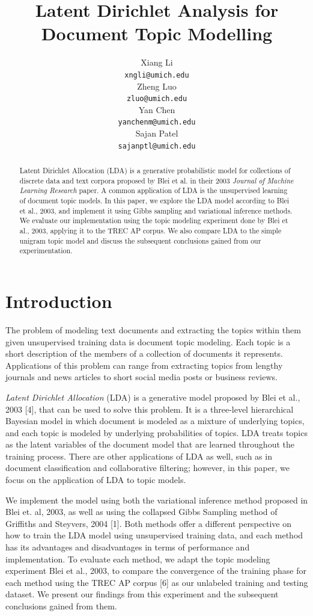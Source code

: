 \documentclass{article} %
\title{Latent Dirichlet Analysis for Document Topic Modelling}
\author{
Xiang Li\\
\texttt{xngli@umich.edu} \\
\And
Zheng Luo \\
\texttt{zluo@umich.edu} \\
\AND
Yan Chen\\
\texttt{yanchenm@umich.edu} \\
\And
Sajan Patel\\
\texttt{sajanptl@umich.edu} \\
}
\begin{document}
\maketitle

\begin{abstract}
Latent Dirichlet Allocation (LDA) is a generative probabilistic model for collections of discrete data and text 
corpora proposed by Blei et al. in their 2003 \textit{Journal\- of Machine Learning Research} paper. 
A common application of LDA is the unsupervised learning of document topic models. 
In this paper, we explore the LDA model according 
to Blei et al., 2003, and implement it using Gibbs sampling and variational inference methods. We evaluate our 
implementation using the topic modeling experiment done by Blei et al., 2003, applying it to the TREC AP corpus. 
We also compare LDA to the simple unigram topic model and discuss the subsequent conclusions gained 
from our experimentation.
\end{abstract}

\section{Introduction}
The problem of modeling text documents and extracting the topics within them given unsupervised training data is 
document topic modeling. Each topic is a short description of the members of a collection of documents it 
represents. Applications of this problem can range from extracting topics from lengthy journals and 
news articles to short social media posts or business reviews. 

\textit{Latent Dirichlet Allocation} (LDA) is a generative model proposed by Blei et al., 2003 [4], that can be used to 
solve this problem. It is a three-level hierarchical Bayesian model in which document is modeled as a mixture of 
underlying topics, and each topic is modeled by underlying probabilities of topics. LDA treats topics as the latent 
variables of the document model that are learned throughout the training process. There are other applications of 
LDA as well, such as in document classification and collaborative filtering; however, in this paper, we focus on the
 application of LDA to topic models. 

We implement the model using both the variational inference method proposed in Blei et. al, 2003, as well as using the collapsed 
Gibbs Sampling method of Griffiths and Steyvers, 2004 [1]. Both methods offer a different perspective on how to train the 
LDA model using unsupervised training data, and each method has its advantages and disadvantages in terms of 
performance and implementation. To evaluate each method, we adapt the topic modeling experiment Blei et al., 2003, 
to compare the convergence of the training phase for each method using the TREC AP corpus [6] as our unlabeled 
training and testing dataset. We present our findings from this experiment and the subsequent conclusions gained from them.
\end{document}

